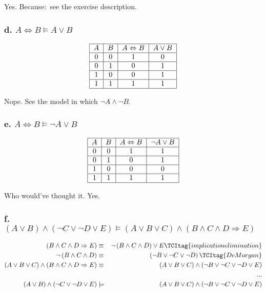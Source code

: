 \documentclass{article}
\begin{document}
Yes. Because:\ see the exercise description.

\subsubsection{d. $A\Leftrightarrow B\models A\vee B$}

\[
\begin{tabular}{|c|c|c|c|}
\hline
$A$ & $B$ & $A\Leftrightarrow B$ & $A\vee B$ \\ \hline
0 & 0 & 1 & 0 \\ \hline
0 & 1 & 0 & 1 \\ \hline
1 & 0 & 0 & 1 \\ \hline
1 & 1 & 1 & 1 \\ \hline
\end{tabular}%
\]

Nope. See the model in which $\lnot A\wedge \lnot B$.

\subsubsection{e. $A\Leftrightarrow B\models \lnot A\vee B$}

\[
\begin{tabular}{|c|c|c|c|}
\hline
$A$ & $B$ & $A\Leftrightarrow B$ & $\lnot A\vee B$ \\ \hline
0 & 0 & 1 & 1 \\ \hline
0 & 1 & 0 & 1 \\ \hline
1 & 0 & 0 & 0 \\ \hline
1 & 1 & 1 & 1 \\ \hline
\end{tabular}%
\]

Who would've thought it. Yes.

\subsubsection{f. $\left( A\vee B\right) \wedge \left( \lnot C\vee \lnot
D\vee E\right) \models \left( A\vee B\vee C\right) \wedge \left( B\wedge
C\wedge D\Rightarrow E\right) $}

\begin{eqnarray}
\left( B\wedge C\wedge D\Rightarrow E\right) &\equiv &\lnot \left( B\wedge
C\wedge D\right) \vee E  \TCItag{implication elimination} \\
\lnot \left( B\wedge C\wedge D\right) &\equiv &\left( \lnot B\vee \lnot
C\vee \lnot D\right)  \TCItag{De Morgan} \\
\left( A\vee B\vee C\right) \wedge \left( B\wedge C\wedge D\Rightarrow
E\right) &\equiv &\left( A\vee B\vee C\right) \wedge \left( \lnot B\vee
\lnot C\vee \lnot D\vee E\right)  \nonumber \\
&&...  \nonumber \\
\left( A\vee B\right) \wedge \left( \lnot C\vee \lnot D\vee E\right)
&\models &\left( A\vee B\vee C\right) \wedge \left( \lnot B\vee \lnot C\vee
\lnot D\vee E\right)  \nonumber
\end{eqnarray}
\end{document}
